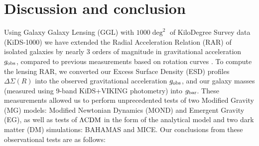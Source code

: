 \documentclass[usenatbib]{mnras}
\newcommand{\lcdm}{{\rm \Lambda CDM}}
\newcommand{\un}[1]{_{\rm #1}}
\begin{document}
\section{Discussion and conclusion}
\label{sec:discon}

Using Galaxy Galaxy Lensing (GGL) with $1000 \deg^2$ of KiloDegree Survey data (KiDS-1000) we have extended the Radial Acceleration Relation (RAR) of isolated galaxies by nearly $3$ orders of magnitude in gravitational acceleration $g\un{obs}$, compared to previous measurements based on rotation curves \cite[most notably][M16]{mcgaugh2016}. To compute the lensing RAR, we converted our Excess Surface Density (ESD) profiles $\Delta\Sigma(R)$ into the observed gravitational acceleration $g\un{obs}$, and our galaxy masses (measured using 9-band KiDS+VIKING photometry) into $g\un{bar}$. These measurements allowed us to perform unprecedented tests of two Modified Gravity (MG) models: Modified Newtonian Dynamics (MOND) and Emergent Gravity (EG), as well as tests of $\lcdm$ in the form of the \cite[][N17]{navarro2017} analytical model and two dark matter (DM) simulations: BAHAMAS and MICE. Our conclusions from these observational tests are as follows:
\end{document}
